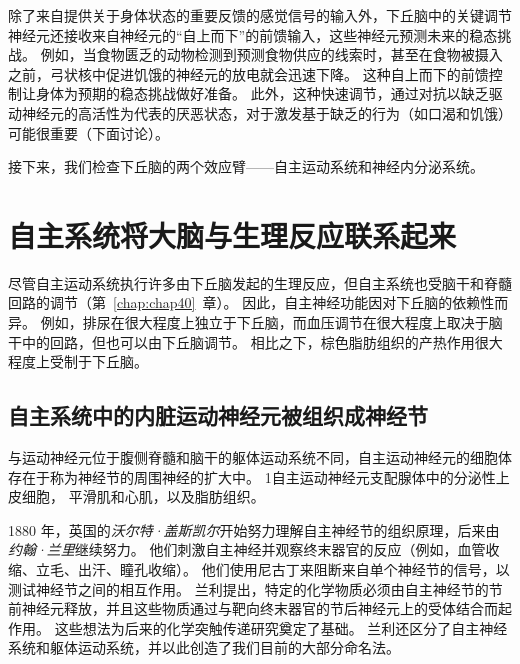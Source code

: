 除了来自提供关于身体状态的重要反馈的感觉信号的输入外，下丘脑中的关键调节神经元还接收来自神经元的“自上而下”的前馈输入，这些神经元预测未来的稳态挑战。
例如，当食物匮乏的动物检测到预测食物供应的线索时，甚至在食物被摄入之前，弓状核中促进饥饿的神经元的放电就会迅速下降。
这种自上而下的前馈控制让身体为预期的稳态挑战做好准备。
此外，这种快速调节，通过对抗以缺乏驱动神经元的高活性为代表的厌恶状态，对于激发基于缺乏的行为（如口渴和饥饿）可能很重要（下面讨论）。


接下来，我们检查下丘脑的两个效应臂——自主运动系统和神经内分泌系统。



\section{自主系统将大脑与生理反应联系起来}

尽管自主运动系统执行许多由下丘脑发起的生理反应，但自主系统也受脑干和脊髓回路的调节（第~\ref{chap:chap40}~章）。
因此，自主神经功能因对下丘脑的依赖性而异。
例如，排尿在很大程度上独立于下丘脑，而血压调节在很大程度上取决于脑干中的回路，但也可以由下丘脑调节。
相比之下，棕色脂肪组织的产热作用很大程度上受制于下丘脑。



\subsection{自主系统中的内脏运动神经元被组织成神经节}

与运动神经元位于腹侧脊髓和脑干的躯体运动系统不同，自主运动神经元的细胞体存在于称为神经节的周围神经的扩大中。
1自主运动神经元支配腺体中的分泌性上皮细胞， 平滑肌和心肌，以及脂肪组织。


1880 年，英国的\textit{沃尔特·盖斯凯尔}开始努力理解自主神经节的组织原理，后来由\textit{约翰·兰里}继续努力。
他们刺激自主神经并观察终末器官的反应（例如，血管收缩、立毛、出汗、瞳孔收缩）。
他们使用尼古丁来阻断来自单个神经节的信号，以测试神经节之间的相互作用。
兰利提出，特定的化学物质必须由自主神经节的节前神经元释放，并且这些物质通过与靶向终末器官的节后神经元上的受体结合而起作用。
这些想法为后来的化学突触传递研究奠定了基础。
兰利还区分了自主神经系统和躯体运动系统，并以此创造了我们目前的大部分命名法。


